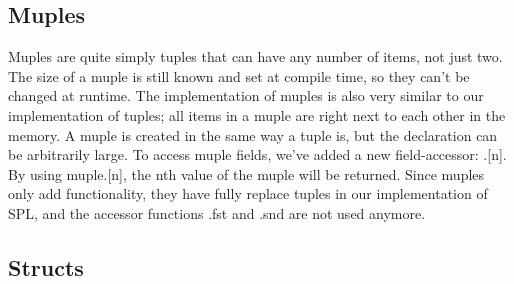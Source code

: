\documentclass[10pt,a4paper]{article}
\begin{document}
\subsection{Muples}
Muples are quite simply tuples that can have any number of items, not just two. The size of a muple is still known and set at compile time, so they can't be changed at runtime. The implementation of muples is also very similar to our implementation of tuples; all items in a muple are right next to each other in the memory. A muple is created in the same way a tuple is, but the declaration can be arbitrarily large. To access muple fields, we've added a new field-accessor: .[n]. By using muple.[n], the nth value of the muple will be returned. Since muples only add functionality, they have fully replace tuples in our implementation of SPL, and the accessor functions .fst and .snd are not used anymore.
\subsection{Structs}


\appendix
\end{document}
